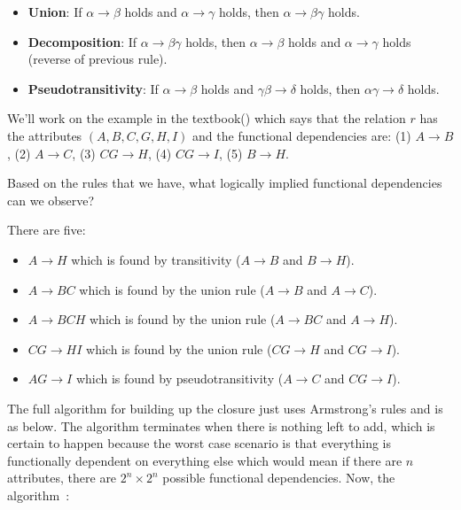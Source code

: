 \documentclass[a4paper]{report}
\begin{document}
\begin{itemize}
	\item \textbf{Union}: If $\alpha \rightarrow \beta$ holds and $\alpha \rightarrow \gamma$ holds, then $\alpha \rightarrow \beta\gamma$ holds.
	\item \textbf{Decomposition}: If $\alpha \rightarrow \beta\gamma$ holds, then  $\alpha \rightarrow \beta$ holds and $\alpha \rightarrow \gamma$ holds (reverse of previous rule).
	\item \textbf{Pseudotransitivity}: If $\alpha \rightarrow \beta$ holds and $\gamma\beta \rightarrow \delta$ holds, then $\alpha\gamma \rightarrow \delta$ holds.
\end{itemize}

We'll work on the example in the textbook(\cite{dsc}) which says that the relation $r$ has the attributes $(A, B, C, G, H, I)$ and the functional dependencies are: (1) $A \rightarrow B$, (2) $A \rightarrow C$, (3) $CG \rightarrow H$, (4) $CG \rightarrow I$, (5) $B \rightarrow H$.

Based on the rules that we have, what logically implied functional dependencies can we observe? 

There are five:
\begin{itemize}
	\item $A \rightarrow H$ which is found by transitivity ($A \rightarrow B$ and $B \rightarrow H$).
	\item $A \rightarrow BC$ which is found by the union rule ($A \rightarrow B$ and $A \rightarrow C$).
	\item $A \rightarrow BCH$ which is found by the union rule ($A \rightarrow BC$ and $A \rightarrow H$).
	\item $CG \rightarrow HI$ which is found by the union rule ($CG \rightarrow H$ and $CG \rightarrow I$).
	\item $AG \rightarrow I$ which is found by pseudotransitivity ($A \rightarrow C$ and $CG \rightarrow I$).
\end{itemize}


The full algorithm for building up the closure just uses Armstrong's rules and is as below. The algorithm terminates when there is nothing left to add, which is certain to happen because the worst case scenario is that everything is functionally dependent on everything else which would mean if there are $n$ attributes, there are $2^{n} \times 2^{n}$ possible functional dependencies. Now, the algorithm~\cite{dsc}:
\end{document}
